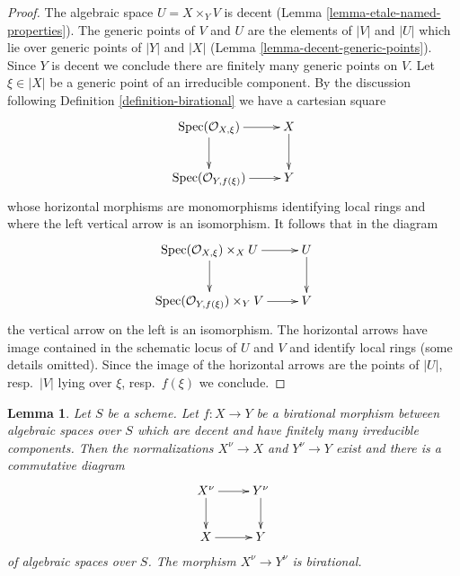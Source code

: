 \documentclass{stacks-project}
\theoremstyle{plain}
\newtheorem{lemma}[subsection]{Lemma}
\theoremstyle{definition}
\theoremstyle{remark}
\numberwithin{equation}{subsection}
\def\Spec{\mathop{\mathrm{Spec}}}
\begin{document}
\begin{proof}
The algebraic space $U = X \times_Y V$ is decent
(Lemma \ref{lemma-etale-named-properties}).
The generic points of $V$ and $U$ are the elements of $|V|$ and $|U|$
which lie over generic points of $|Y|$ and $|X|$
(Lemma \ref{lemma-decent-generic-points}).
Since $Y$ is decent we conclude there are finitely many generic points
on $V$. Let $\xi \in |X|$ be a generic point of an irreducible component.
By the discussion following Definition \ref{definition-birational}
we have a cartesian square
$$
\xymatrix{
\Spec(\mathcal{O}_{X, \xi}) \ar[d] \ar[r] & X \ar[d] \\
\Spec(\mathcal{O}_{Y, f(\xi)}) \ar[r] & Y
}
$$
whose horizontal morphisms are monomorphisms identifying local rings
and where the left vertical arrow is an isomorphism. It follows that
in the diagram
$$
\xymatrix{
\Spec(\mathcal{O}_{X, \xi}) \times_X U \ar[d] \ar[r] & U \ar[d] \\
\Spec(\mathcal{O}_{Y, f(\xi)}) \times_Y V \ar[r] & V
}
$$
the vertical arrow on the left is an isomorphism. The horizontal arrows
have image contained in the schematic locus of $U$ and $V$ and
identify local rings (some details omitted). Since the image of
the horizontal arrows are the points of $|U|$, resp.\ $|V|$
lying over $\xi$, resp.\ $f(\xi)$ we conclude.
\end{proof}

\begin{lemma}
\label{lemma-birational-induced-morphism-normalizations}
Let $S$ be a scheme. Let $f : X \to Y$ be a birational morphism between
algebraic spaces over $S$ which are decent and have finitely many irreducible
components. Then the normalizations $X^\nu \to X$ and $Y^\nu \to Y$ exist
and there is a commutative diagram
$$
\xymatrix{
X^\nu \ar[r] \ar[d] &  Y^\nu \ar[d] \\
X \ar[r] & Y
}
$$
of algebraic spaces over $S$. The morphism $X^\nu \to Y^\nu$ is birational.
\end{lemma}
\end{document}
